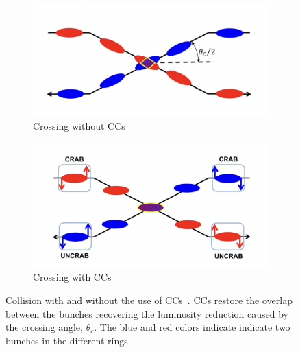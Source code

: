 \begin{figure}[!ht]
    \centering
    \begin{subfigure}[t]{0.45\textwidth}
        \centering
        \includegraphics[width=1\textwidth]{images/introduction/no_crab_crossing.png}
        \caption{Crossing without CCs}
    \end{subfigure}
    \hfill
    \begin{subfigure}[t]{0.45\textwidth}
        \centering
        \includegraphics[width=1\textwidth]{images/introduction/crab_crossing.png}
        \caption{Crossing with CCs}
    \end{subfigure}
    \hfill
     \caption{Collision with and without the use of CCs~\cite{Verdú-Andrés:2263119}. CCs restore the overlap between the bunches recovering the luminosity reduction caused by the crossing angle, $\theta_c$. The blue and red colors indicate indicate two bunches in the different rings.} 
     \label{fig:crossing_with_and_without_CCs}
 \end{figure}


